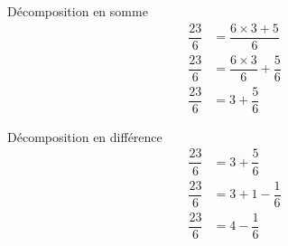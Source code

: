 \begin{changemargin}{0mm}{-15mm}
\begin{methode}
            \bigskip
            \begin{minipage}{0.5\linewidth}
                \begin{center}
                    Décomposition en somme                    
                    \begin{align*}
                        \dfrac{23}{6} &= \dfrac{6\times3+5}{6}\\
                        \dfrac{23}{6} &= \dfrac{6\times3}{6}+\dfrac56\\
                        \dfrac{23}{6} &= 3+\dfrac56
                    \end{align*}
                \end{center}
            \end{minipage}
            \vrule
            \begin{minipage}{0.5\linewidth}
                \begin{center}
                    Décomposition en différence                    
                    \begin{align*}
                        \dfrac{23}{6} &= 3+\dfrac56\\                        
                        \dfrac{23}{6} &= 3+1-\dfrac16\\
                        \dfrac{23}{6} &= 4-\dfrac16
                    \end{align*}
                \end{center}
            \end{minipage}
    \end{methode}
\end{changemargin}
 
